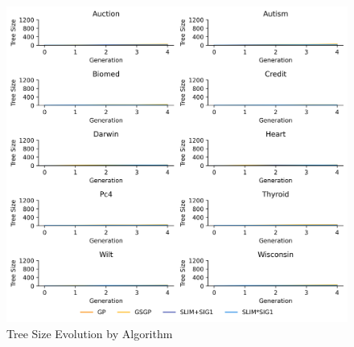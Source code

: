 
    \begin{figure}[H]
    \centering
    \includegraphics[width=\linewidth]{../Latex/Chapters/Figures/Results/comparison_test_tree_size_evolution.png}
    \caption{Tree Size Evolution by Algorithm}
    \label{fig:comparison_test_tree_size_evolution}
    \end{figure}
    
